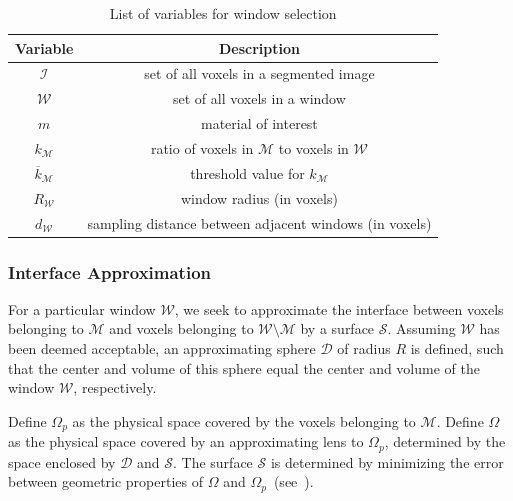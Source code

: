 \begin{table}[htbp!]
 \centering
   \begin{tabular}{|c||c|}
   \hline
   {\textbf{Variable}} & \textbf{Description} \\ \hline \hline
   $\mathcal{I}$ & set of all voxels in a segmented image \\ \hline
   $\mathcal{W}$ & set of all voxels in a window \\ \hline
   $m$ & material of interest \\ \hline
   {$k_{\mathcal{M}}$} & ratio of voxels in $\mathcal{M}$ to voxels in $\mathcal{W}$\\ \hline
   {$\overline{k}_{\mathcal{M}}$ \rule{0mm}{4mm}} & threshold value for $k_{\mathcal{M}}$ \\ \hline 
   $R_{\mathcal{W}}$ & window radius (in voxels) \\ \hline
   $d_{\mathcal{W}}$ & sampling distance between adjacent windows (in voxels) \\ \hline  
\end{tabular}
\caption{List of variables for window selection}
\label{tab:window}
\end{table}

\subsubsection{Interface Approximation}

For a particular window $\mathcal{W}$, we seek to approximate the interface between voxels belonging to $\mathcal{M}$ and voxels belonging to $\mathcal{W} \setminus \mathcal{M}$ by a surface $\mathcal{S}$. Assuming $\mathcal{W}$ has been deemed acceptable, an approximating sphere $\mathcal{D}$ of radius $R$ is defined, such that the center and volume of this sphere equal the center and volume of the window $\mathcal{W}$, respectively.

Define $\Omega_p$ as the physical space covered by the voxels belonging to $\mathcal{M}$. Define $\Omega$ as the physical space covered by an approximating lens to $\Omega_p$, determined by the space enclosed by $\mathcal{D}$ and $\mathcal{S}$. The surface $\mathcal{S}$ is determined by minimizing the error between geometric properties of $\Omega$ and $\Omega_p$~(see~).

